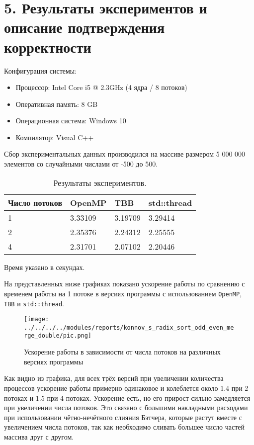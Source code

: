 \documentclass{report}
\begin{document}
    \newpage
    \section*{5. Результаты экспериментов и описание подтверждения корректности}
    \par Конфигурация системы:
    \begin{itemize}
        \item Процессор: Intel Core i5 @ 2.3GHz (4 ядра / 8 потоков)
        \item Оперативная память: 8 GB
        \item Операционная система: Windows 10
        \item Компилятор: Visual C++
    \end{itemize}
    \par Сбор экспериментальных данных производился на массиве размером 5 000 000 элементов со случайными числами от -500 до 500.
    \begin{table}[hbtp]
        \centering
        \begin{tabular}{||l||l|l|l||}
        \hline \hline
        Число потоков & OpenMP  & TBB     & std::thread \\
        \hline \hline
        1             & 3.33109 & 3.19709 & 3.29414     \\
        \hline
        2             & 2.35376 & 2.24312 & 2.25555     \\
        \hline
        4             & 2.31701 & 2.07102 & 2.20446     \\
        \hline \hline
        \end{tabular}
        \caption{Результаты экспериментов.}
        Время указано в секундах.
    \end{table}
    \par На представленных ниже графиках показано ускорение работы по сравнению с временем работы на 1 потоке в версиях программы с использованием \verb|OpenMP|, \verb|TBB| и \verb|std::thread|.
    \begin{figure}[htbp]
        \centering
        \texttt{[image: ../../../../modules/reports/konnov\_s\_radix\_sort\_odd\_even\_merge\_double/pic.png]}
        \caption{Ускорение работы в зависимости от числа потоков на различных версиях программы}
    \end{figure}
    \par Как видно из графика, для всех трёх версий при увеличении количества процессов ускорение работы примерно одинаковое и колеблется около 1.4 при 2 потоках и 1.5 при 4 потоках. Ускорение есть, но его прирост сильно замедляется при увеличении числа потоков. Это связано с большими накладными расходами при использовании чётно-нечётного слияния Бэтчера, которые растут вместе с увеличением числа потоков, так как необходимо сливать большее число частей массива друг с другом.
    \clearpage
\end{document}
